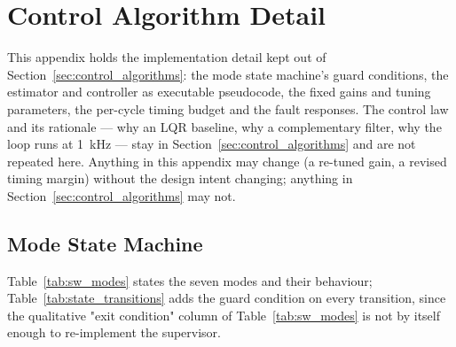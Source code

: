 \section{Control Algorithm Detail}
\label{app:control_algorithms}

This appendix holds the implementation detail kept out of
Section~\ref{sec:control_algorithms}: the mode state machine's guard
conditions, the estimator and controller as executable pseudocode, the fixed
gains and tuning parameters, the per-cycle timing budget and the fault
responses. The control law and its rationale --- why an LQR baseline, why a
complementary filter, why the loop runs at \qty{1}{\kilo\hertz} --- stay in
Section~\ref{sec:control_algorithms} and are not repeated here. Anything in
this appendix may change (a re-tuned gain, a revised timing margin) without
the design intent changing; anything in Section~\ref{sec:control_algorithms}
may not.

\subsection{Mode State Machine}
\label{app:state_machine}

Table~\ref{tab:sw_modes} states the seven modes and their behaviour;
Table~\ref{tab:state_transitions} adds the guard condition on every
transition, since the qualitative "exit condition" column of
Table~\ref{tab:sw_modes} is not by itself enough to re-implement the
supervisor.

